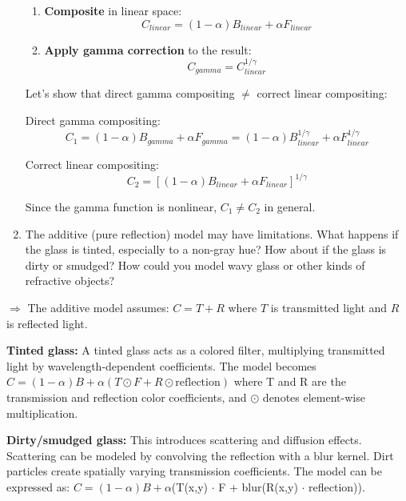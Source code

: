 \documentclass[12pt,a4paper]{article}
\begin{document}
\begin{enumerate}
\begin{enumerate}
\item \textbf{Composite} in linear space:
\begin{equation}
C_{linear} = (1 - \alpha)B_{linear} + \alpha F_{linear}
\end{equation}

\item \textbf{Apply gamma correction} to the result:
\begin{equation}
C_{gamma} = C_{linear}^{1/\gamma}
\end{equation}
\end{enumerate}

Let's show that direct gamma compositing $\neq$ correct linear compositing:

Direct gamma compositing:
\begin{equation}
C_1 = (1-\alpha)B_{gamma} + \alpha F_{gamma} = (1-\alpha)B_{linear}^{1/\gamma} + \alpha F_{linear}^{1/\gamma}
\end{equation}

Correct linear compositing:
\begin{equation}
C_2 = [(1-\alpha)B_{linear} + \alpha F_{linear}]^{1/\gamma}
\end{equation}

Since the gamma function is nonlinear, $C_1 \neq C_2$ in general.

\item The additive (pure reﬂection) model may have limitations. What happens if the glass is
tinted, especially to a non-gray hue? How about if the glass is dirty or smudged? How
could you model wavy glass or other kinds of refractive objects?
\end{enumerate}

$\Rightarrow$ The additive model assumes: $C = T + R$ where $T$ is transmitted light and $R$ is reflected light.

\textbf{Tinted glass:} A tinted glass acts as a colored filter, multiplying transmitted light by wavelength-dependent coefficients. 
The model becomes $C = (1 - \alpha)B + \alpha(T \odot F + R \odot \text{reflection})$ where T and R are the transmission 
and reflection color coefficients, and $\odot$ denotes element-wise multiplication.

\textbf{Dirty/smudged glass:} This introduces scattering and diffusion effects. Scattering can be modeled by convolving the reflection 
with a blur kernel. Dirt particles create spatially varying transmission coefficients. The model can be expressed as: 
$C = (1 - \alpha)B + \alpha$(T(x,y) $\cdot$ F + blur(R(x,y) $\cdot$ reflection)).
\end{document}
